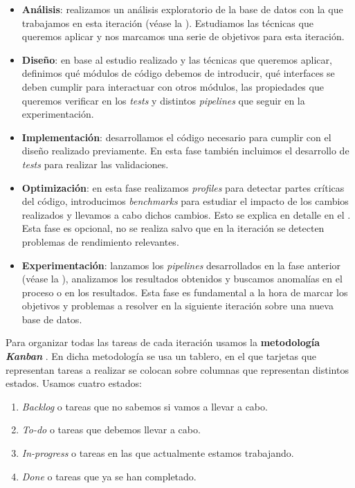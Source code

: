\begin{itemize}
	\item \textbf{Análisis}: realizamos un análisis exploratorio de la base de datos con la que trabajamos en esta iteración (véase la ). Estudiamos las técnicas que queremos aplicar y nos marcamos una serie de objetivos para esta iteración.
	\item \textbf{Diseño}: en base al estudio realizado y las técnicas que queremos aplicar, definimos qué módulos de código debemos de introducir, qué interfaces se deben cumplir para interactuar con otros módulos, las propiedades que queremos verificar en los \textit{tests} y distintos \textit{pipelines} que seguir en la experimentación.
	\item \textbf{Implementación}: desarrollamos el código necesario para cumplir con el diseño realizado previamente. En esta fase también incluimos el desarrollo de \textit{tests} para realizar las validaciones.
	\item \textbf{Optimización}: en esta fase realizamos \textit{profiles} para detectar partes críticas del código, introducimos \textit{benchmarks} para estudiar el impacto de los cambios realizados y llevamos a cabo dichos cambios. Esto se explica en detalle en el . Esta fase es opcional, no se realiza salvo que en la iteración se detecten problemas de rendimiento relevantes.
	\item \textbf{Experimentación}: lanzamos los \textit{pipelines} desarrollados en la fase anterior (véase la ), analizamos los resultados obtenidos y buscamos anomalías en el proceso o en los resultados. Esta fase es fundamental a la hora de marcar los objetivos y problemas a resolver en la siguiente iteración sobre una nueva base de datos.
\end{itemize}

Para organizar todas las tareas de cada iteración usamos la \textbf{metodología \textit{Kanban}} \cite{informatica:kanban_paper}. En dicha metodología se usa un tablero, en el que tarjetas que representan tareas a realizar se colocan sobre columnas que representan distintos estados. Usamos cuatro estados:

\begin{enumerate}
	\item \textit{Backlog} o tareas que no sabemos si vamos a llevar a cabo.
	\item \textit{To-do} o tareas que debemos llevar a cabo.
	\item \textit{In-progress} o tareas en las que actualmente estamos trabajando.
	\item \textit{Done} o tareas que ya se han completado.
\end{enumerate}

